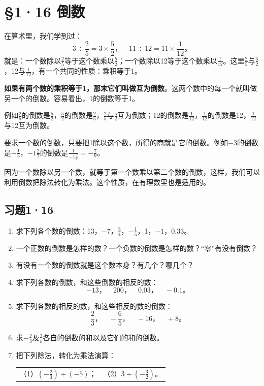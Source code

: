 \section{§1·16 倒数}

在算术里，我们学到过：
\[
3 \div \frac{2}{5} = 3 \times \frac{5}{2}， \quad 11 \div 12 = 11 \times \frac{1}{12}。
\]
就是：一个数除以\(\frac{2}{5}\)等于这个数乘以\(\frac{5}{2}\)；一个数除以12等于这个数乘以\(\frac{1}{12}\)。这里\(\frac{2}{5}\)与\(\frac{5}{2}\)，12与\(\frac{1}{12}\)，有一个共同的性质：乘积等于1。

\textbf{如果有两个数的乘积等于1，那末它们叫做互为倒数}。这两个数中的每一个就叫做另一个的倒数。容易看出，1的倒数等于1。

例如\(\frac{2}{5}\)的倒数是\(\frac{5}{2}\)，\(\frac{5}{2}\)的倒数是\(\frac{2}{5}\)，\(\frac{2}{5}\)与\(\frac{5}{2}\)互为倒数；12的倒数是\(\frac{1}{12}\)，\(\frac{1}{12}\)的倒数是12，\(\frac{1}{12}\)与12互为倒数。

要求一个数的倒数，只要把1除以这个数，所得的商就是它的倒数。例如$-3$的倒数是\(-\frac{1}{3}\)，\(-1\frac{2}{7}\)的倒数是\(\frac{1}{-1\frac{2}{7}} = -\frac{7}{9}\)。

因为一个数除以另一个数，就等于第一个数乘以第二个数的倒数，这样，我们可以利用倒数把除法转化为乘法。这个性质，在有理数里也是适用的。

\subsection{习题1·16}

\begin{enumerate}
\item 求下列各个数的倒数：13，$-7$，\(\frac{3}{4}\)，\(-\frac{1}{5}\)，1，$-1$，$0.33$。
\item 一个正数的倒数是怎样的数？一个负数的倒数是怎样的数？“零”有没有倒数？
\item 有没有一个数的倒数就是这个数本身？有几个？哪几个？
\item 求下列各数的倒数，和这些倒数的相反的数：
  \[
  -13， \quad 200， \quad 0.03， \quad -0.1。
  \]
\item 求下列各数的相反的数，和这些相反的数的倒数：
  \[
  \frac{2}{3}， \quad -\frac{6}{5}， \quad -16， \quad +8。
  \]
\item 求\(-\frac{2}{3}\)及\(\frac{2}{5}\)各自的倒数的和以及它们的和的倒数。
\item 把下列除法，转化为乘法演算：
  \par\smallskip
  \begin{tabular}{@{}ll@{}}
  （1）\(\left(-\frac{2}{3}\right) \div (-5)\)；\qquad\qquad & （2）\(3 \div \left(-\frac{3}{2}\right)\)。
  \end{tabular}
\end{enumerate}

